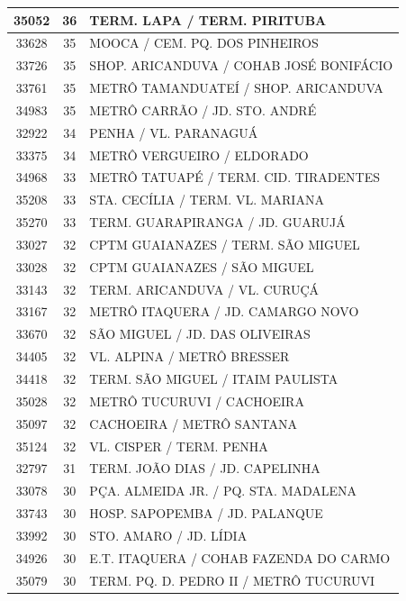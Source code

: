 \documentclass[
	12pt,				%
	oneside,			%
	a4paper,			%
	english,			%
	brazil				%
	]{abntex2ppgsi}
\begin{document}
\begin{apendicesenv}
\begin{longtable}{c|c|p{7cm}}
\hline
    35052 & 36    & TERM. LAPA / TERM. PIRITUBA \\
\hline
    33628 & 35    & MOOCA / CEM. PQ. DOS PINHEIROS \\
\hline
    33726 & 35    & SHOP. ARICANDUVA / COHAB JOSÉ BONIFÁCIO \\
\hline
    33761 & 35    & METRÔ TAMANDUATEÍ / SHOP. ARICANDUVA \\
\hline
    34983 & 35    & METRÔ CARRÃO / JD. STO. ANDRÉ \\
\hline
    32922 & 34    & PENHA / VL. PARANAGUÁ \\
\hline
    33375 & 34    & METRÔ VERGUEIRO / ELDORADO \\
\hline
    34968 & 33    & METRÔ TATUAPÉ / TERM. CID. TIRADENTES \\
\hline
    35208 & 33    & STA. CECÍLIA / TERM. VL. MARIANA \\
\hline
    35270 & 33    & TERM. GUARAPIRANGA / JD. GUARUJÁ \\
\hline
    33027 & 32    & CPTM GUAIANAZES / TERM. SÃO MIGUEL \\
\hline
    33028 & 32    & CPTM GUAIANAZES / SÃO MIGUEL \\
\hline
    33143 & 32    & TERM. ARICANDUVA / VL. CURUÇÁ \\
\hline
    33167 & 32    & METRÔ ITAQUERA / JD. CAMARGO NOVO \\
\hline
    33670 & 32    & SÃO MIGUEL / JD. DAS OLIVEIRAS \\
\hline
    34405 & 32    & VL. ALPINA / METRÔ BRESSER \\
\hline
    34418 & 32    & TERM. SÃO MIGUEL / ITAIM PAULISTA \\
\hline
    35028 & 32    & METRÔ TUCURUVI / CACHOEIRA \\
\hline
    35097 & 32    & CACHOEIRA / METRÔ SANTANA \\
\hline
    35124 & 32    & VL. CISPER / TERM. PENHA \\
\hline
    32797 & 31    & TERM. JOÃO DIAS / JD. CAPELINHA \\
\hline
    33078 & 30    & PÇA. ALMEIDA JR. / PQ. STA. MADALENA \\
\hline
    33743 & 30    & HOSP. SAPOPEMBA / JD. PALANQUE \\
\hline
    33992 & 30    & STO. AMARO / JD. LÍDIA \\
\hline
    34926 & 30    & E.T. ITAQUERA / COHAB FAZENDA DO CARMO \\
\hline
    35079 & 30    & TERM. PQ. D. PEDRO II / METRÔ TUCURUVI \\

\end{longtable}
\end{apendicesenv}
\end{document}
